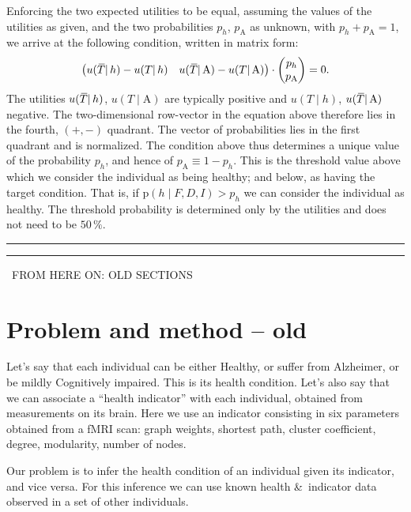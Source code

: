 \documentclass[\ifafour a4paper,12pt,\else a5paper,10pt,\fi%
onecolumn,oneside,article,%
british%
]{memoir}
\theoremstyle{remark}
\theoremstyle{innote}
\newcommand*{\amp}{\&}
\newcommand*{\pf}{\mathrm{p}}%
\renewcommand*{\|}{\mathpunct{|}}
\newcommand*{\puzzle}{\maltese}
\newcommand{\mynote}[1]{ {\footnotesize\color{notecolour}\puzzle\ #1} }
\newcommand*{\widebar}[1]{{\mkern1.5mu\skew{2}\overline{\mkern-1.5mu#1\mkern-1.5mu}\mkern 1.5mu}}
\newcommand*{\yh}{h}
\newcommand*{\yD}{D}
\newcommand*{\yF}{F}
\newcommand*{\ya}{\mathrm{A}}
\newcommand*{\yI}{I}
\newcommand*{\yT}{T}
\newcommand*{\ynT}{\widebar{\yT}}
\newcommand*{\yu}{u}
\theoremstyle{plain}
\begin{document}
Enforcing the two expected utilities to be equal, assuming the values of
the utilities as given, and the two probabilities $p_{\yh}$, $p_{\ya}$ as
unknown, with $p_{\yh} + p_{\ya} = 1$, we arrive at the following
condition, written in matrix form:
\begin{equation}
  \label{eq:utilities_equal}
  \begin{pmatrix}
    \yu(\ynT \| \yh) - \yu(\yT \| \yh)
    &
    \yu(\ynT \| \ya) - \yu(\yT \| \ya)
  \end{pmatrix}
  \cdot
  \begin{pmatrix}
    p_{\yh}
    \\
     p_{\ya}
   \end{pmatrix}
   = 0.
\end{equation}
The utilities $\yu(\ynT \| \yh)$, $\yu(\yT \| \ya)$ are typically positive
and $\yu(\yT \| \yh)$, $\yu(\ynT \| \ya)$ negative. The two-dimensional
row-vector in the equation above therefore lies in the fourth,
$(\mathord{+},\mathord{-})$ quadrant. The vector of probabilities lies in
the first quadrant and is normalized. The condition above thus determines a
unique value of the probability $p_{\yh}$, and hence of
$p_{\ya} \equiv 1 - p_{\yh}$. This is the threshold value above which we
consider the individual as being healthy; and below, as having the target
condition. That is, if $\pf(\yh \|\yF, \yD, \yI) > p_{\yh}$ we can consider
the individual as healthy. The threshold probability is determined only by
the utilities and does not need to be $50\,\%$.




\bigskip
\hrule

\hrule

\bigskip
\mynote{FROM HERE ON: OLD SECTIONS}


\section{Problem and method -- old}

Let's say that each individual can be either Healthy, or suffer from
Alzheimer, or be mildly Cognitively impaired. This is its health condition.
Let's also say that we can associate a \enquote{health indicator} with each
individual, obtained from measurements on its brain. Here we use an
indicator consisting in six parameters obtained from a fMRI scan: graph
weights, shortest path, cluster coefficient, degree, modularity, number of
nodes.

Our problem is to infer the health condition of an individual given its
indicator, and vice versa. For this inference we can use known health \amp\
indicator data observed in a set of other individuals.
\end{document}
